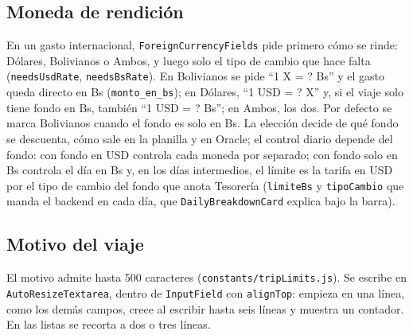\documentclass[11pt,letterpaper]{article}
\newcommand{\code}[1]{\nolinkurl{#1}}
\begin{document}
\subsection{Moneda de rendición}
En un gasto internacional, \code{ForeignCurrencyFields} pide primero cómo se rinde: Dólares, Bolivianos o Ambos, y luego solo el tipo de cambio que hace falta (\code{needsUsdRate}, \code{needsBsRate}). En Bolivianos se pide ``1 X = ? Bs'' y el gasto queda directo en Bs (\code{monto_en_bs}); en Dólares, ``1 USD = ? X'' y, si el viaje solo tiene fondo en Bs, también ``1 USD = ? Bs''; en Ambos, los dos. Por defecto se marca Bolivianos cuando el fondo es solo en Bs. La elección decide de qué fondo se descuenta, cómo sale en la planilla y en Oracle; el control diario depende del fondo: con fondo en USD controla cada moneda por separado; con fondo solo en Bs controla el día en Bs y, en los días intermedios, el límite es la tarifa en USD por el tipo de cambio del fondo que anota Tesorería (\code{limiteBs} y \code{tipoCambio} que manda el backend en cada día, que \code{DailyBreakdownCard} explica bajo la barra).

\subsection{Motivo del viaje}
El motivo admite hasta 500 caracteres (\code{constants/tripLimits.js}). Se escribe en \code{AutoResizeTextarea}, dentro de \code{InputField} con \code{alignTop}: empieza en una línea, como los demás campos, crece al escribir hasta seis líneas y muestra un contador. En las listas se recorta a dos o tres líneas.
\end{document}
